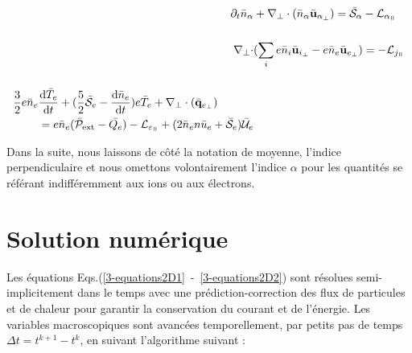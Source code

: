\begin{refsection}
\begin{align}
\label{3-equations2D1}
\partial_t \bar{n}_\alpha& +
\nabla_\perp\cdot\left(\bar{n}_\alpha\bar{\mathbf{u}}_{\alpha_\perp}\right)=\bar{\mathcal{S}}_\alpha
- \mathcal{L}_{\alpha_\para}\\[0.5cm]
\nabla_\perp\cdot&(\sum_ie\bar{n}_i\bar{\mathbf{u}}_{i_\perp}
-e\bar{n}_e\bar{\mathbf{u}}_{e_\perp})= - \mathcal{L}_{j_\para}\\[0.5cm]
\begin{split}\frac{3}{2}e\bar{n}_e&\frac{\text{d}\bar{T}_e}{\text{d}t} +
(\frac{5}{2}\bar{\mathcal{S}}_e
-\frac{\text{d}\bar{n}_e}{\text{d}t})e\bar{T}_e+\nabla_\perp\cdot(\bar{\mathbf{q}}_{e_\perp})\\
&=e\bar{n}_e(\bar{\mathcal{P}}_\text{ext}-\bar{Q_e})-\mathcal{L}_{\varepsilon_\para}
+(2\bar{n}_en\bar{u}_e+\bar{\mathcal{S}}_e)\bar{\mathcal{U}}_e
\label{3-equations2D2}
\end{split}
\end{align}

Dans la suite, nous laissons de côté la notation de moyenne, l'indice
perpendiculaire et nous omettons volontairement l'indice $\alpha$ pour les
quantités se référant indifféremment aux ions ou aux électrons.

\section{Solution numérique}

Les équations Eqs.(\ref{3-equations2D1}~-~\ref{3-equations2D2}) sont résolues
semi-implicitement dans le temps avec une prédiction-correction des flux de
particules et de chaleur pour garantir la conservation du courant et de
l'énergie. Les variables macroscopiques sont avancées temporellement, par
petits pas de temps $\Delta t=t^{k+1}-t^k$, en suivant l'algorithme suivant :


\end{refsection}

